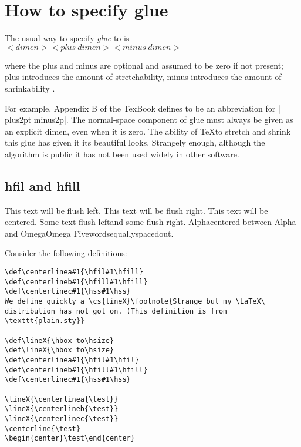 \section{How to specify glue}

The usual way to specify \textit{glue} to \tex is
$<dimen>< plus~dimen><minus~dimen>$

where the plus and minus are optional and assumed to be zero if not
present; plus introduces the amount of stretchability, minus introduces the amount of shrinkability . 

For example, Appendix B of the TexBook defines  to be an abbreviation for
|\vskip6pt plus2pt minus2p|. The normal-space component of glue must always be
given as an explicit dimen, even when it is zero. The ability of \TeX to stretch and shrink this glue has given it its beautiful looks. Strangely enough, although the algorithm is public it has not been used widely in other software.



\subsection{hfil and hfill}

{\obeylines
{This text will be flush left.\hfil}
{\hfil This text will be flush right.}
{\hfil This text will be centered.\hfil}
{Some text flush left\hfil and some flush right.}
{Alpha\hfil centered between Alpha and Omega\hfil Omega}
{Five\hfil words\hfil equally\hfil spaced\hfil out.}
}

Consider the following definitions:

\begin{verbatim}
\def\centerlinea#1{\hfil#1\hfill}
\def\centerlineb#1{\hfill#1\hfill}
\def\centerlinec#1{\hss#1\hss}
We define quickly a \cs{lineX}\footnote{Strange but my \LaTeX\ distribution has not got on. (This definition is from \texttt{plain.sty}}

\def\lineX{\hbox to\hsize}
\def\lineX{\hbox to\hsize}
\def\centerlinea#1{\hfil#1\hfil}
\def\centerlineb#1{\hfill#1\hfill}
\def\centerlinec#1{\hss#1\hss}

\lineX{\centerlinea{\test}}
\lineX{\centerlineb{\test}}
\lineX{\centerlinec{\test}}
\centerline{\test}
\begin{center}\test\end{center}

\end{verbatim}


